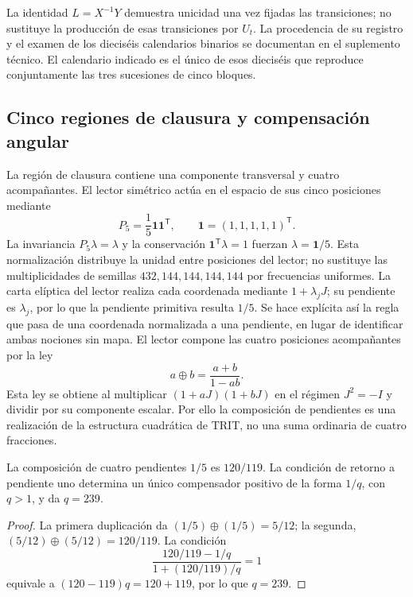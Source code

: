 La identidad \(L=X^{-1}Y\) demuestra unicidad una vez fijadas las transiciones; no sustituye la producción de esas transiciones por \(U_t\). La procedencia de su registro y el examen de los dieciséis calendarios binarios se documentan en el suplemento técnico. El calendario indicado es el único de esos dieciséis que reproduce conjuntamente las tres sucesiones de cinco bloques.

\subsection{Cinco regiones de clausura y compensación angular}

La región de clausura contiene una componente transversal y cuatro acompañantes. El lector simétrico actúa en el espacio de sus cinco posiciones mediante
\[
 P_5=\frac15\mathbf1\mathbf1^{\mathsf T},\qquad
 \mathbf1=(1,1,1,1,1)^{\mathsf T}.
\]
La invariancia \(P_5\lambda=\lambda\) y la conservación \(\mathbf1^{\mathsf T}\lambda=1\) fuerzan \(\lambda=\mathbf1/5\). Esta normalización distribuye la unidad entre posiciones del lector; no sustituye las multiplicidades de semillas \(432,144,144,144,144\) por frecuencias uniformes. La carta elíptica del lector realiza cada coordenada mediante \(1+\lambda_jJ\); su pendiente es \(\lambda_j\), por lo que la pendiente primitiva resulta \(1/5\). Se hace explícita así la regla que pasa de una coordenada normalizada a una pendiente, en lugar de identificar ambas nociones sin mapa. El lector compone las cuatro posiciones acompañantes por la ley
\begin{equation}
 a\oplus b=\frac{a+b}{1-ab}.
 \label{x_reciprocidad:eq:suma-pendientes}
\end{equation}
Esta ley se obtiene al multiplicar \((1+aJ)(1+bJ)\) en el régimen \(J^2=-I\) y dividir por su componente escalar. Por ello la composición de pendientes es una realización de la estructura cuadrática de TRIT, no una suma ordinaria de cuatro fracciones.

\begin{proposition}
La composición de cuatro pendientes \(1/5\) es \(120/119\). La condición de retorno a pendiente uno determina un único compensador positivo de la forma \(1/q\), con \(q>1\), y da \(q=239\).
\end{proposition}
\begin{proof}
La primera duplicación da \((1/5)\oplus(1/5)=5/12\); la segunda, \((5/12)\oplus(5/12)=120/119\). La condición
\[
 \frac{120/119-1/q}{1+(120/119)/q}=1
\]
equivale a \((120-119)q=120+119\), por lo que \(q=239\).
\end{proof}

